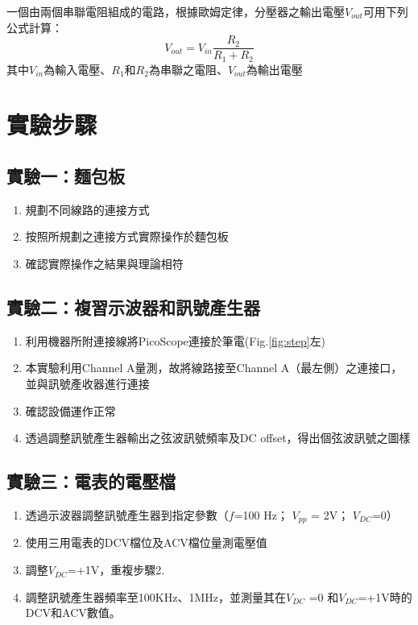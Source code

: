 \documentclass[12pt,a4paper]{article}
\begin{document}
\begin{CJK}{UTF8}{bkai}
一個由兩個串聯電阻組成的電路，根據歐姆定律，分壓器之輸出電壓$V_{out}$可用下列公式計算：
\begin{equation}
\label{eq:r1r2}
    V_{out} = V_{in}\frac{R_{2}}{R_{1}+R_{2}}
\end{equation}
其中$V_{in}$為輸入電壓、$R_{1}$和$R_{2}$為串聯之電阻、$V_{out}$為輸出電壓


\section{實驗步驟}
\subsection{實驗一：麵包板}\label{subsec:step_1}
\begin{enumerate}
    \item 規劃不同線路的連接方式
    \item 按照所規劃之連接方式實際操作於麵包板
    \item 確認實際操作之結果與理論相符
\end{enumerate}

\subsection{實驗二：複習示波器和訊號產生器}\label{subsec:step_2}

\begin{enumerate}
    \item 利用機器所附連接線將PicoScope連接於筆電(Fig.\ref{fig:step}左)
    \item 本實驗利用Channel A量測，故將線路接至Channel A（最左側）之連接口，並與訊號產收器進行連接
    \item 確認設備運作正常
    \item 透過調整訊號產生器輸出之弦波訊號頻率及DC offset，得出個弦波訊號之圖樣
\end{enumerate}

\subsection{實驗三：電表的電壓檔}\label{subsec:step_3}

\begin{enumerate}
    \item 透過示波器調整訊號產生器到指定參數（$f$=100 Hz； $V_{pp}$ = 2V； $V_{DC}$=0）
    \item 使用三用電表的DCV檔位及ACV檔位量測電壓值
    \item 調整$V_{DC}$=+1V，重複步驟2.
    \item 調整訊號產生器頻率至100KHz、1MHz，並測量其在$V_{DC}$ =0 和$V_{DC}$=+1V時的DCV和ACV數值。
\end{enumerate}


\end{CJK}
\end{document}
